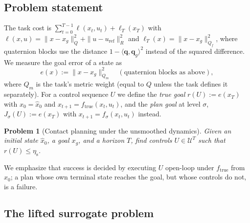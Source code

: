 \documentclass[11pt]{article}
\newtheorem{problem}{Problem}
\theoremstyle{remark}
\newcommand{\ftrue}{f_{\mathrm{true}}}
\newcommand{\etas}{\eta_{\mathrm{s}}}
\newcommand{\U}{\mathcal{U}}
\begin{document}
\subsection{Problem statement}

The task cost is $\sum_{t=0}^{T-1} \ell(x_t, u_t) + \ell_T(x_T)$ with $\ell(x,u) = \|x - x_g\|^2_Q + \|u - u_{\mathrm{ref}}\|^2_R$ and $\ell_T(x) = \|x - x_g\|^2_{Q_f}$, where quaternion blocks use the distance $1 - \langle \mathbf q, \mathbf q_g\rangle^2$ instead of the squared difference. We measure the goal error of a state as
\begin{equation}
\label{eq:err}
e(x) := \|x - x_g\|^2_{Q_m} \quad (\text{quaternion blocks as above}),
\end{equation}
where $Q_m$ is the task's metric weight (equal to $Q$ unless the task defines it separately). For a control sequence $U$ we define the \emph{true goal} $r(U) := e(x_T)$ with $x_0 = \hat x_0$ and $x_{t+1} = \ftrue(x_t, u_t)$, and the \emph{plan goal} at level $\sigma$, $J_\sigma(U) := e(x_T)$ with $x_{t+1} = f_\sigma(x_t, u_t)$ instead.

\begin{problem}[Contact planning under the unsmoothed dynamics]
\label{prob:true}
Given an initial state $\hat x_0$, a goal $x_g$, and a horizon $T$, find controls $U \in \U^T$ such that $r(U) \leq \etas$.
\end{problem}

We emphasize that success is decided by executing $U$ open-loop under $\ftrue$ from $\hat x_0$; a plan whose own terminal state reaches the goal, but whose controls do not, is a failure.

\subsection{The lifted surrogate problem}
\end{document}

